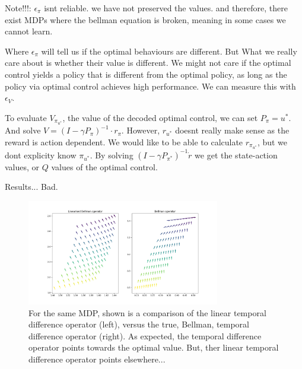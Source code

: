 {\color{red}Note!!!: $\epsilon_{\pi}$ isnt reliable. we have not preserved the values.
and therefore, there exist MDPs where the bellman equation is broken, meaning in some cases we cannot learn.}

Where $\epsilon_{\pi}$ will tell us if the optimal behaviours are different. But What we really care about
is whether their value is different. We might not care if the optimal control
yields a policy that is different from the optimal policy, as long as the
policy via optimal control achieves high performance. We can measure this with $\epsilon_{V}$.

To evaluate $V_{\pi_{u^{* }}}$, the value of the decoded optimal control, we can
set $P_{\pi} = u^{* }$. And solve $V = (I - \gamma P_{\pi})^{-1} \cdot r_{\pi}$.
However, $r_{u^{* }}$ doesnt really make sense as the reward is action
dependent. We would like to be able to calculate $r_{\pi_{u^{* } }}$, but we dont
explicity know \(\pi_{u^{* }}\). By solving $(I - \gamma P_{\pi^{* }})^{-1} \dot r$
we get the state-action values, or $Q$ values of the optimal control.

Results... Bad.

\begin{figure}
\centering
\includegraphics[width=0.75\textwidth,height=0.5\textheight]{../../pictures/figures/LBO_BO.png}
\caption{For the same MDP, shown is a comparison of the linear temporal difference operator (left), versus the true, Bellman, temporal difference operator (right). As expected, the temporal difference operator points towards the optimal value. But, ther linear temporal difference operator points elsewhere...}
\end{figure}

